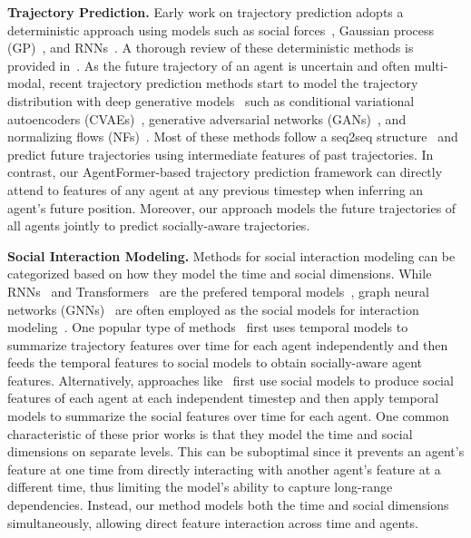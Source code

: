 \documentclass[10pt,twocolumn,letterpaper]{article}
\newcommand{\mname}{AgentFormer}
\begin{document}
\vspace{1mm}
\noindent\textbf{Trajectory Prediction.}
Early work on trajectory prediction adopts a deterministic approach using models such as social forces~\cite{helbing1995social}, Gaussian process (GP)~\cite{wang2007gaussian}, and RNNs~\cite{alahi2016social,morton2016analysis,vemula2018social}. A thorough review of these deterministic methods is provided in~\cite{rudenko2020human}. As the future trajectory of an agent is uncertain and often multi-modal, recent trajectory prediction methods start to model the trajectory distribution with deep generative models~\cite{kingma2013auto,goodfellow2014generative,rezende2015variational} such as conditional variational autoencoders (CVAEs)~\cite{lee2017desire,yuan2019diverse,ivanovic2019trajectron,tang2019multiple,weng2020joint,salzmann2020trajectron++}, generative adversarial networks (GANs)~\cite{gupta2018social,sadeghian2019sophie,kosaraju2019social,zhao2019multi}, and normalizing flows (NFs)~\cite{rhinehart2018r2p2,rhinehart2019precog,guan2020generative}. Most of these methods follow a seq2seq structure~\cite{bahdanau2014neural,cho2014learning} and predict future trajectories using intermediate features of past trajectories. In contrast, our \mname-based trajectory prediction framework can directly attend to features of any agent at any previous timestep when inferring an agent's future position. Moreover, our approach models the future trajectories of all agents jointly to predict socially-aware trajectories.


\vspace{1mm}
\noindent\textbf{Social Interaction Modeling.} Methods for social interaction modeling can be categorized based on how they model the time and social dimensions. While RNNs~\cite{hochreiter1997long,chung2014empirical} and Transformers~\cite{vaswani2017attention} are the prefered temporal models~\cite{huang2019stgat,alahi2016social,yu2020spatio}, graph neural networks (GNNs)~\cite{kipf2016semi,li2015gated} are often employed as the social models for interaction modeling~\cite{kipf2018neural,li2020evolvegraph,kosaraju2019social}. One popular type of methods~\cite{kosaraju2019social,alahi2016social,gupta2018social} first uses temporal models to summarize trajectory features over time for each agent independently and then feeds the temporal features to social models to obtain socially-aware agent features. Alternatively, approaches like~\cite{salzmann2020trajectron++,huang2019stgat} first use social models to produce social features of each agent at each independent timestep and then apply temporal models to summarize the social features over time for each agent. One common characteristic of these prior works is that they model the time and social dimensions on separate levels. This can be suboptimal since it prevents an agent's feature at one time from directly interacting with another agent's feature at a different time, thus limiting the model's ability to capture long-range dependencies. Instead, our method models both the time and social dimensions simultaneously, allowing direct feature interaction across time and agents.
\end{document}
